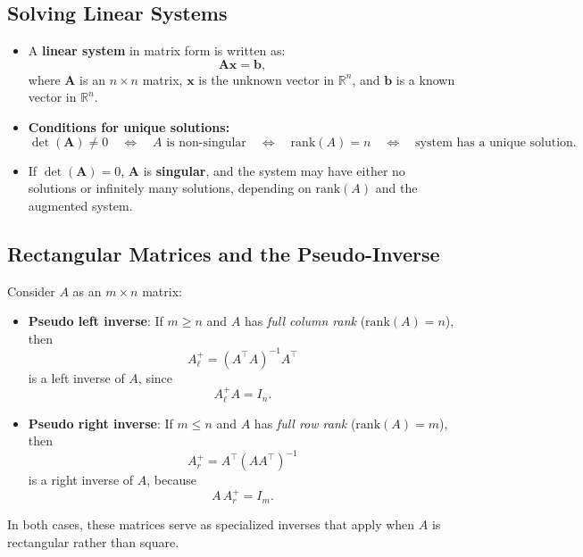 \documentclass[12pt]{article}
\begin{document}
\subsection*{Solving Linear Systems}
\begin{itemize}
    \item A \textbf{linear system} in matrix form is written as:
    \[
        \bm{A} \bm{x} = \bm{b},
    \]
    where $\bm{A}$ is an $n \times n$ matrix, $\bm{x}$ is the unknown vector in $\mathbb{R}^n$, and $\bm{b}$ is a known vector in $\mathbb{R}^n$.
    \item \textbf{Conditions for unique solutions:}
    \[
        \det(\bm{A}) \neq 0 \quad \Longleftrightarrow \quad A \text{ is non-singular} 
        \quad \Longleftrightarrow \quad \mathrm{rank}(A) = n \quad \Longleftrightarrow \quad \text{system has a unique solution}.
    \]
    \item If $\det(\bm{A}) = 0$, $\bm{A}$ is \textbf{singular}, and the system may have either no solutions or infinitely many solutions, depending on $\mathrm{rank}(A)$ and the augmented system.
\end{itemize}

\subsection*{Rectangular Matrices and the Pseudo-Inverse}

Consider $A$ as an $m \times n$ matrix:
\begin{itemize}
    \item \textbf{Pseudo left inverse}: If $m \ge n$ and $A$ has \emph{full column rank} ($\mathrm{rank}(A) = n$), then 
    \[
        A_\ell^+ = (A^\top A)^{-1} A^\top
    \]
    is a left inverse of $A$, since 
    \[
        A_\ell^+ A = I_n.
    \]
    \item \textbf{Pseudo right inverse}: If $m \le n$ and $A$ has \emph{full row rank} ($\mathrm{rank}(A) = m$), then 
    \[
        A_r^+ = A^\top (A A^\top)^{-1}
    \]
    is a right inverse of $A$, because 
    \[
        A\, A_r^+ = I_m.
    \]
\end{itemize}
In both cases, these matrices serve as specialized inverses that apply when $A$ is rectangular rather than square. 
\end{document}
